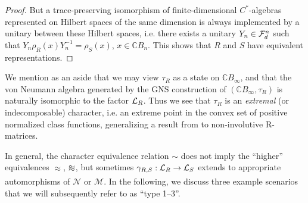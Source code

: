 \documentclass[12pt,a4paper]{amsart}
\numberwithin{equation}{section}
\theoremstyle{remark}
\newcommand{\Cl}{\mathbb{C}}
\newcommand{\CM}[0]{\mathcal{M}} \newcommand{\CN}[0]{\mathcal{N}}
\def\apeqA{\SavedStyle\sim}
\def\Msim{\setstackgap{L}{\dimexpr.5pt+1.5\LMpt}\ensurestackMath{%
  \ThisStyle{\mathrel{\Centerstack{{\apeqA} {\apeqA} {\apeqA}}}}}}
\def\Nsim{\approx}
\begin{document}
\begin{proof}
    But a trace-preserving isomorphism of finite-dimensional $C^*$-algebras represented on Hilbert spaces of the same dimension is always implemented by a unitary between these Hilbert spaces, i.e. there exists a unitary $Y_n\in\mathcal{F}_d^n$ such that $Y_n\rho_R(x)Y_n^{-1}=\rho_S(x)$, $x\in\Cl B_n$. This shows that $R$ and $S$ have equivalent representations.   
\end{proof}

We mention as an aside that we may view $\tau_R$ as a state on $\Cl B_\infty$, and that the von Neumann algebra generated by the GNS construction of $(\Cl B_\infty,\tau_R)$ is naturally isomorphic to the factor $\mathcal{L}_R$. Thus we see that $\tau_R$ is an {\em extremal} (or indecomposable) character, i.e. an extreme point in the convex set of positive normalized class functions, generalizing a result from \cite{LechnerPennigWood:2019} to non-involutive R-matrices. 

\bigskip

In general, the character equivalence relation $\sim$ does not imply the ``higher'' equivalences $\Nsim$, $\Msim$, but sometimes $\gamma_{R,S}:\mathcal{L}_R\to\mathcal{L}_S$ extends to appropriate automorphisms of $\CN$ or $\CM$. In the following, we discuss three example scenarios that we will subsequently refer to as ``type 1--3''.
\end{document}
